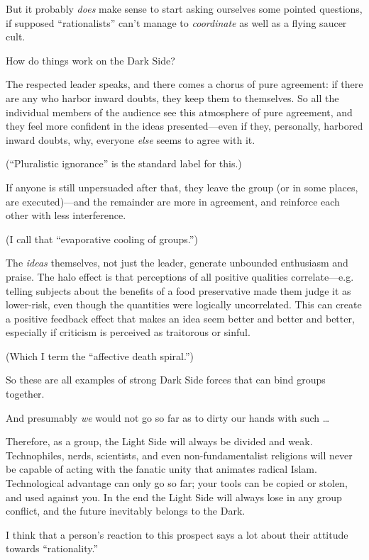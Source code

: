 {
 But it probably \textit{does} make sense to start asking ourselves
some pointed questions, if supposed
``rationalists''
can't manage to \textit{coordinate} as well as a flying
saucer cult.}

{
 How do things work on the Dark Side?}

{
 The respected leader speaks, and there comes a chorus of pure
agreement: if there are any who harbor inward doubts, they keep them to
themselves. So all the individual members of the audience see this
atmosphere of pure agreement, and they feel more confident in the ideas
presented---even if they, personally, harbored inward doubts, why,
everyone \textit{else} seems to agree with it.}

{
 (``Pluralistic ignorance'' is
the standard label for this.)}

{
 If anyone is still unpersuaded after that, they leave the group
(or in some places, are executed)---and the remainder are more in
agreement, and reinforce each other with less interference.}

{
 (I call that ``evaporative cooling of
groups.'')}

{
 The \textit{ideas} themselves, not just the leader, generate
unbounded enthusiasm and praise. The halo effect is that perceptions of
all positive qualities correlate---e.g. telling subjects about the
benefits of a food preservative made them judge it as lower-risk, even
though the quantities were logically uncorrelated. This can create a
positive feedback effect that makes an idea seem better and better and
better, especially if criticism is perceived as traitorous or sinful.}

{
 (Which I term the ``affective death
spiral.'')}

{
 So these are all examples of strong Dark Side forces that can bind
groups together.}

{
 And presumably \textit{we} would not go so far as to dirty our
hands with such \ldots}

{
 Therefore, as a group, the Light Side will always be divided and
weak. Technophiles, nerds, scientists, and even non-fundamentalist
religions will never be capable of acting with the fanatic unity that
animates radical Islam. Technological advantage can only go so far;
your tools can be copied or stolen, and used against you. In the end
the Light Side will always lose in any group conflict, and the future
inevitably belongs to the Dark.}

{
 I think that a person's reaction to this prospect
says a lot about their attitude towards
``rationality.''}

